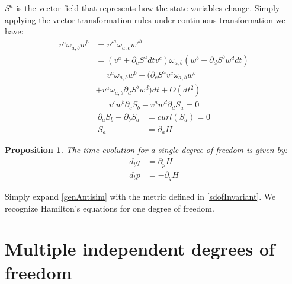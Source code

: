 \documentclass[aps,pra,10pt,twocolumn,floatfix,nofootinbib]{revtex4-1}
\newtheorem{prop}[thm]{Proposition}
\theoremstyle{definition}
\begin{document}
$S^{a}$ is the vector field that represents how the state variables change. Simply applying the vector transformation rules under continuous transformation we have:
\begin{align*}
v^{a} \omega_{a, b} w^{b} &= v'^{a} \omega_{a, c} w'^{b}  \\
&= (v^{a} + \partial_{c} S^{a} dt v^{c}) \omega_{a, b} ( w^{b} + \partial_{d} S^{b} w^{d} dt) \\
&= v^{a} \omega_{a, b} w^{b} + (\partial_{c} S^{a} v^{c} \omega_{a, b} w^{b} \\
 &+ v^{a} \omega_{a, b} \partial_{d} S^{b} w^{d}) dt + O(dt^2)
\end{align*}
\begin{align*}
v^{c} w^{b} \partial_{c} S_{b} - v^{a} w^{d} \partial_{d} S_{a} = 0
\end{align*}
\begin{align*}
\partial_{a} S_{b} - \partial_{b} S_{a} &= curl(S_{a}) = 0 \\
S_{a} &= \partial_{a}H
\end{align*}

\begin{prop}\label{sdofHam}
The time evolution for a single degree of freedom is given by:
\begin{align*}
d_{t}q &= \partial_{p} H \\
d_{t}p &= - \partial_{q} H
\end{align*}
\end{prop}

Simply expand \ref{genAntisim} with the metric defined in \ref{sdofInvariant}. We recognize Hamilton's equations for one degree of freedom\cite{classical_dynamics}.

\section{Multiple independent degrees of freedom}
\end{document}
